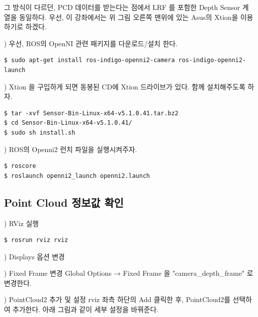 그 방식이 다르던, PCD 데이터를 받는다는 점에서 LRF 를 포함한 Depth Sensor 계열을 동일하다. 우선, 이 강좌에서는 위 그림 오른쪽 맨위에 있는 Asus의 Xtion을 이용하기로 하겠다. 

\setcounter{num}{0}

\vspace{\baselineskip}
\noindent
{}
\thenum) 우선, ROS의 OpenNI 관련 패키지를 다운로드/설치 한다.

\begin{lstlisting}[language=ROS]
$ sudo apt-get install ros-indigo-openni2-camera ros-indigo-openni2-launch
\end{lstlisting}

\vspace{\baselineskip}
\noindent
{}
\thenum) Xtion 을 구입하게 되면 동봉된 CD에 Xtion 드라이브가 있다. 함께 설치해주도록 하자.

\begin{lstlisting}[language=ROS]
$ tar -xvf Sensor-Bin-Linux-x64-v5.1.0.41.tar.bz2
$ cd Sensor-Bin-Linux-x64-v5.1.0.41/
$ sudo sh install.sh 
\end{lstlisting}

\vspace{\baselineskip}
\noindent
{}
\thenum) ROS의 Openni2 런치 파일을 실행시켜주자.

\begin{lstlisting}[language=ROS]
$ roscore
$ roslaunch openni2_launch openni2.launch
\end{lstlisting}

\subsection{Point Cloud 정보값 확인}

\setcounter{num}{0}

\thenum) RViz 실행

\begin{lstlisting}[language=ROS]
$ rosrun rviz rviz
\end{lstlisting}

\noindent
{}
\thenum) Displays 옵션 변경

\vspace{\baselineskip}
\noindent
{}) Fixed Frame 변경
Global Options → Fixed Frame 을 "camera\_depth\_frame" 로 변경한다.

\vspace{\baselineskip}
\noindent
{}) PointCloud2 추가 및 설정
rviz 좌측 하단의 Add 클릭한 후, PointCloud2를 선택하여 추가한다. 아래 그림과 같이 세부 설정을 바꿔준다.

